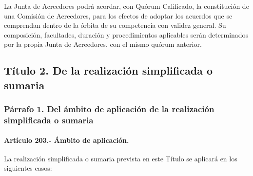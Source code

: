 \documentclass[
]{book}
\begin{document}
La Junta de Acreedores podrá acordar, con Quórum Calificado, la constitución de una Comisión de Acreedores, para los efectos de adoptar los acuerdos que se comprendan dentro de la órbita de su competencia con validez general. Su composición, facultades, duración y procedimientos aplicables serán determinados por la propia Junta de Acreedores, con el mismo quórum anterior.

\hypertarget{tuxedtulo-2.-de-la-realizaciuxf3n-simplificada-o-sumaria}{%
\subsection*{Título 2. De la realización simplificada o sumaria}\label{tuxedtulo-2.-de-la-realizaciuxf3n-simplificada-o-sumaria}}

\hypertarget{puxe1rrafo-1.-del-uxe1mbito-de-aplicaciuxf3n-de-la-realizaciuxf3n-simplificada-o-sumaria}{%
\subsubsection*{Párrafo 1. Del ámbito de aplicación de la realización simplificada o sumaria}\label{puxe1rrafo-1.-del-uxe1mbito-de-aplicaciuxf3n-de-la-realizaciuxf3n-simplificada-o-sumaria}}

\hypertarget{artuxedculo-203.--uxe1mbito-de-aplicaciuxf3n.}{%
\paragraph*{Artículo 203.- Ámbito de aplicación.}\label{artuxedculo-203.--uxe1mbito-de-aplicaciuxf3n.}}

La realización simplificada o sumaria prevista en este Título se aplicará en los siguientes casos:
\end{document}
